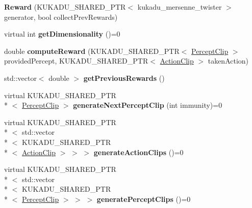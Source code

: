 \begin{DoxyCompactItemize}
\item 
\hypertarget{classkukadu_1_1Reward_a2eeceb6c818e6964cb88c9e524d2045c}{{\bfseries Reward} (K\-U\-K\-A\-D\-U\-\_\-\-S\-H\-A\-R\-E\-D\-\_\-\-P\-T\-R$<$ kukadu\-\_\-mersenne\-\_\-twister $>$ generator, bool collect\-Prev\-Rewards)}\label{classkukadu_1_1Reward_a2eeceb6c818e6964cb88c9e524d2045c}

\item 
\hypertarget{classkukadu_1_1Reward_ab3207c5a18655541d4db592219d67595}{virtual int {\bfseries get\-Dimensionality} ()=0}\label{classkukadu_1_1Reward_ab3207c5a18655541d4db592219d67595}

\item 
\hypertarget{classkukadu_1_1Reward_a989f7e9a5dd36fc4ee786147870e6af3}{double {\bfseries compute\-Reward} (K\-U\-K\-A\-D\-U\-\_\-\-S\-H\-A\-R\-E\-D\-\_\-\-P\-T\-R$<$ \hyperlink{classkukadu_1_1PerceptClip}{Percept\-Clip} $>$ provided\-Percept, K\-U\-K\-A\-D\-U\-\_\-\-S\-H\-A\-R\-E\-D\-\_\-\-P\-T\-R$<$ \hyperlink{classkukadu_1_1ActionClip}{Action\-Clip} $>$ taken\-Action)}\label{classkukadu_1_1Reward_a989f7e9a5dd36fc4ee786147870e6af3}

\item 
\hypertarget{classkukadu_1_1Reward_af54aac1737849f765ed82e6ee052f486}{std\-::vector$<$ double $>$ {\bfseries get\-Previous\-Rewards} ()}\label{classkukadu_1_1Reward_af54aac1737849f765ed82e6ee052f486}

\item 
\hypertarget{classkukadu_1_1Reward_a308ddd203d220b4715ed4cb4268ac9ab}{virtual K\-U\-K\-A\-D\-U\-\_\-\-S\-H\-A\-R\-E\-D\-\_\-\-P\-T\-R\\*
$<$ \hyperlink{classkukadu_1_1PerceptClip}{Percept\-Clip} $>$ {\bfseries generate\-Next\-Percept\-Clip} (int immunity)=0}\label{classkukadu_1_1Reward_a308ddd203d220b4715ed4cb4268ac9ab}

\item 
\hypertarget{classkukadu_1_1Reward_ac569bee7aac35ae3f762d5769d254fc8}{virtual K\-U\-K\-A\-D\-U\-\_\-\-S\-H\-A\-R\-E\-D\-\_\-\-P\-T\-R\\*
$<$ std\-::vector\\*
$<$ K\-U\-K\-A\-D\-U\-\_\-\-S\-H\-A\-R\-E\-D\-\_\-\-P\-T\-R\\*
$<$ \hyperlink{classkukadu_1_1ActionClip}{Action\-Clip} $>$ $>$ $>$ {\bfseries generate\-Action\-Clips} ()=0}\label{classkukadu_1_1Reward_ac569bee7aac35ae3f762d5769d254fc8}

\item 
\hypertarget{classkukadu_1_1Reward_a0d1addb6e9e93326d66ff7b4613cf0a0}{virtual K\-U\-K\-A\-D\-U\-\_\-\-S\-H\-A\-R\-E\-D\-\_\-\-P\-T\-R\\*
$<$ std\-::vector\\*
$<$ K\-U\-K\-A\-D\-U\-\_\-\-S\-H\-A\-R\-E\-D\-\_\-\-P\-T\-R\\*
$<$ \hyperlink{classkukadu_1_1PerceptClip}{Percept\-Clip} $>$ $>$ $>$ {\bfseries generate\-Percept\-Clips} ()=0}\label{classkukadu_1_1Reward_a0d1addb6e9e93326d66ff7b4613cf0a0}

\end{DoxyCompactItemize}
